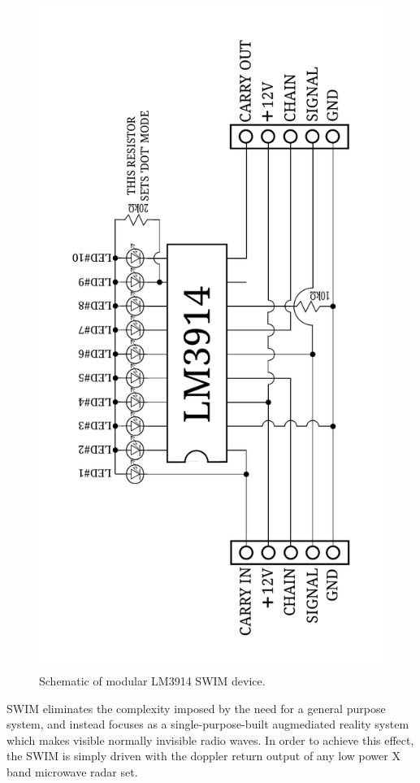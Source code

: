 \documentclass{sigchi-ext}
\begin{document}
\begin{figure}
 \centering
 \includegraphics[scale = 0.274, angle = 270]{3914schem.pdf}
 \caption{Schematic of modular LM3914 SWIM device.}
 \label{fig:schematic3914}
\end{figure}
SWIM eliminates the complexity imposed by the need for a general
purpose system, and instead focuses as a single-purpose-built augmediated
reality system which makes visible normally invisible radio waves. In order to
achieve this effect, the SWIM is simply driven with the doppler return output
of any low power X band microwave radar set.
\end{document}
